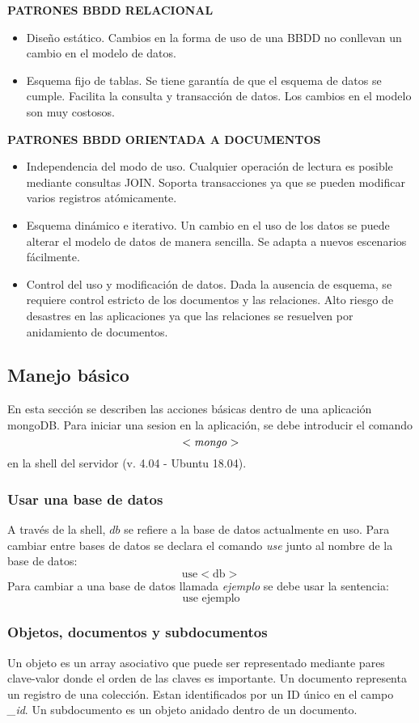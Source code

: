 \textbf{PATRONES BBDD RELACIONAL}
\begin{itemize}
	\item Diseño estático. Cambios en la forma de uso de una BBDD no conllevan un cambio en el modelo de datos.
	\item Esquema fijo de tablas. Se tiene garantía de que el esquema de datos se cumple. Facilita la consulta y transacción de datos. Los cambios en el modelo son muy costosos.
\end{itemize}


\textbf{PATRONES BBDD ORIENTADA A DOCUMENTOS}
\begin{itemize}
	\item Independencia del modo de uso. Cualquier operación de lectura es posible mediante consultas JOIN. Soporta transacciones ya que se pueden modificar varios registros atómicamente.
	\item Esquema dinámico e iterativo. Un cambio en el uso de los datos se puede alterar el modelo de datos de manera sencilla. Se adapta a nuevos escenarios fácilmente.
	\item Control del uso y modificación de datos. Dada la ausencia de esquema, se requiere control estricto de los documentos y las relaciones. Alto riesgo de desastres en las aplicaciones ya que las relaciones se resuelven por anidamiento de documentos.
\end{itemize}
\subsection{Manejo básico}
En esta sección se describen las acciones básicas dentro de una aplicación mongoDB. Para iniciar una sesion en la aplicación, se debe introducir el comando $$<\textrm{\textit{mongo}}>$$ en la shell del servidor (v. 4.04 - Ubuntu 18.04).
\subsubsection{Usar una base de datos}
A través de la shell, $db$ se refiere a la base de datos actualmente en uso. Para cambiar entre bases de datos se declara el comando \textit{use} junto al nombre de la base de datos:
$$\textrm{use} <\textrm{db}>$$
Para cambiar a una base de datos llamada \textit{ejemplo} se debe usar la sentencia:
$$\textrm{use } \textrm{ejemplo}$$
\subsubsection{Objetos, documentos y subdocumentos}
Un objeto es un array asociativo que puede ser representado mediante pares clave-valor donde el orden de las claves es importante. Un documento representa un registro de una colección. Estan identificados por un ID único en el campo \textit{\_id}. Un subdocumento es un objeto anidado dentro de un documento.
